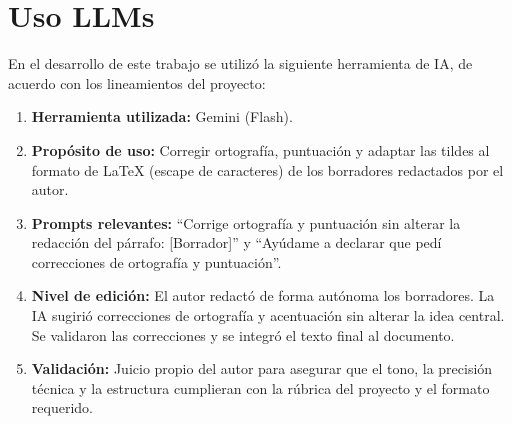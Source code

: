 \documentclass[letter, 10pt]{article}
\begin{document}
\section{Uso LLMs}
\noindent En el desarrollo de este trabajo se utiliz\'o la siguiente herramienta de IA, de acuerdo con los lineamientos del proyecto:

\begin{enumerate}
\item \textbf{Herramienta utilizada:} Gemini (Flash).
\item \textbf{Prop\'osito de uso:} Corregir ortograf\'ia, puntuaci\'on y adaptar las tildes al formato de \LaTeX{} (escape de caracteres) de los borradores redactados por el autor.
\item \textbf{Prompts relevantes:} ``Corrige ortograf\'ia y puntuaci\'on sin alterar la redacci\'on del p\'arrafo: [Borrador]'' y ``Ay\'udame a declarar que ped\'i correcciones de ortograf\'ia y puntuaci\'on''.
\item \textbf{Nivel de edici\'on:} El autor redact\'o de forma aut\'onoma los borradores. La IA sugiri\'o correcciones de ortograf\'ia y acentuaci\'on sin alterar la idea central. Se validaron las correcciones y se integr\'o el texto final al documento.
\item \textbf{Validaci\'on:} Juicio propio del autor para asegurar que el tono, la precisi\'on t\'ecnica y la estructura cumplieran con la r\'ubrica del proyecto y el formato requerido.
\end{enumerate}



\end{document}
